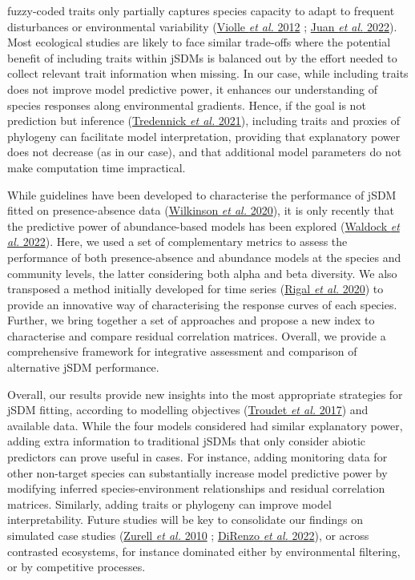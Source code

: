 \documentclass[9pt,biorxiv,doublespacing,lineno]{lapreprint}
\begin{document}
fuzzy-coded traits only partially captures species capacity to adapt to
frequent disturbances or environmental variability
(\protect\hyperlink{ref-Violle_2012}{Violle \emph{et al.} 2012} ;
\protect\hyperlink{ref-deJuan_2022}{Juan \emph{et al.} 2022}). Most
ecological studies are likely to face similar trade-offs where the
potential benefit of including traits within jSDMs is balanced out by
the effort needed to collect relevant trait information when missing. In
our case, while including traits does not improve model predictive
power, it enhances our understanding of species responses along
environmental gradients. Hence, if the goal is not prediction but
inference (\protect\hyperlink{ref-Tredennick_2021}{Tredennick \emph{et
al.} 2021}), including traits and proxies of phylogeny can facilitate
model interpretation, providing that explanatory power does not decrease
(as in our case), and that additional model parameters do not make
computation time impractical.

While guidelines have been developed to characterise the performance of
jSDM fitted on presence-absence data
(\protect\hyperlink{ref-Wilkinson_2020}{Wilkinson \emph{et al.} 2020}),
it is only recently that the predictive power of abundance-based models
has been explored (\protect\hyperlink{ref-Waldock_2022}{Waldock \emph{et
al.} 2022}). Here, we used a set of complementary metrics to assess the
performance of both presence-absence and abundance models at the species
and community levels, the latter considering both alpha and beta
diversity. We also transposed a method initially developed for time
series (\protect\hyperlink{ref-Rigal_2020}{Rigal \emph{et al.} 2020}) to
provide an innovative way of characterising the response curves of each
species. Further, we bring together a set of approaches and propose a
new index to characterise and compare residual correlation matrices.
Overall, we provide a comprehensive framework for integrative assessment
and comparison of alternative jSDM performance.

Overall, our results provide new insights into the most appropriate
strategies for jSDM fitting, according to modelling objectives
(\protect\hyperlink{ref-Troudet_2017}{Troudet \emph{et al.} 2017}) and
available data. While the four models considered had similar explanatory
power, adding extra information to traditional jSDMs that only consider
abiotic predictors can prove useful in cases. For instance, adding
monitoring data for other non-target species can substantially increase
model predictive power by modifying inferred species-environment
relationships and residual correlation matrices. Similarly, adding
traits or phylogeny can improve model interpretability. Future studies
will be key to consolidate our findings on simulated case studies
(\protect\hyperlink{ref-Zurell_2010}{Zurell \emph{et al.} 2010} ;
\protect\hyperlink{ref-DiRenzo_2022}{DiRenzo \emph{et al.} 2022}), or
across contrasted ecosystems, for instance dominated either by
environmental filtering, or by competitive processes.
\end{document}
